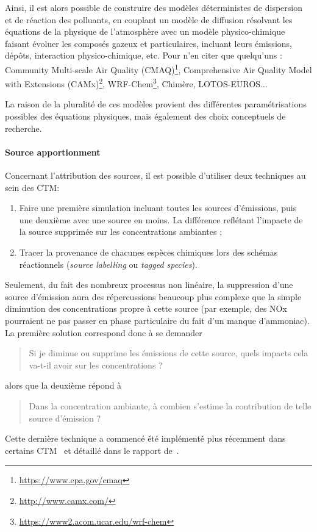 Ainsi, il est alors possible de construire des modèles déterministes de dispersion et de
réaction des polluants, en couplant un modèle de diffusion résolvant les équations de la
physique de l'atmosphère avec un modèle physico-chimique faisant évoluer les composés
gazeux et particulaires, incluant leurs émissions, dépôts, interaction physico-chimique,
etc. Pour n'en citer que quelqu'uns : 
Community Multi-scale Air Quality (CMAQ)\footnote{\url{https://www.epa.gov/cmaq}},
Comprehensive Air Quality Model with Extensions (CAMx)\footnote{\url{http://www.camx.com/}},
WRF-Chem\footnote{\url{https://www2.acom.ucar.edu/wrf-chem}},
Chimère,
LOTOS-EUROS...

La raison de la pluralité de ces modèles provient des différentes paramétrisations
possibles des équations physiques, mais également des choix conceptuels de recherche.

\paragraph{Source apportionment}%
\label{par:source_apportionment}

Concernant l'attribution des sources, il est possible d'utiliser deux techniques au sein
des CTM:

\begin{enumerate}
    \item Faire une première simulation incluant toutes les sources d'émissions, puis une
        deuxième avec une source en moins. La différence reflétant l'impacte de la source
        supprimée sur les concentrations ambiantes ;
    \item Tracer la provenance de chacunes espèces chimiques lors des schémas réactionnels
        (\textit{source labelling} ou \textit{tagged species}).
\end{enumerate}

Seulement, du fait des nombreux processus non linéaire, la suppression d'une source
d'émission aura des répercussions beaucoup plus complexe que la simple diminution des
concentrations propre à cette source (par exemple, des NOx pourraient ne pas passer en
phase particulaire du fait d'un manque d'ammoniac). La première solution correspond donc à
se demander 
\begin{quote}
    Si je diminue ou supprime les émissions de cette source, quels impacts cela va-t-il
    avoir sur les concentrations ?
\end{quote}
alors que la deuxième répond à
\begin{quote}
    Dans la concentration ambiante, à combien s'estime la contribution de telle source
    d'émission ?
\end{quote}
Cette dernière technique a commencé été implémenté plus récemment dans certains
CTM~\autocite{wangDevelopment2009,wagstromDevelopment2008,kranenburgSource2013,brandtContribution2013}
et détaillé dans le rapport de~\textcite{mirceaEuropean2020}.

